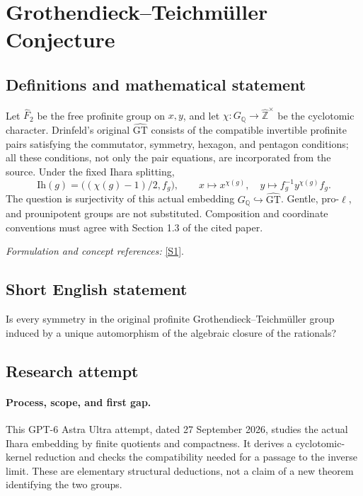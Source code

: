 \documentclass[11pt]{article}
\begin{document}
\section*{\texorpdfstring{Grothendieck–Teichmüller Conjecture}{Grothendieck–Teichmüller Conjecture}}\label{91}
\subsection{Definitions and mathematical statement}
Let $\widehat F_2$ be the free profinite group on $x,y$, and let $\chi:G_{{\mathbb{Q}}}\to\widehat{{\mathbb{Z}}}^\times$ be the cyclotomic character. Drinfeld's original $\widehat{\mathrm{GT}}$ consists of the compatible invertible profinite pairs satisfying the commutator, symmetry, hexagon, and pentagon conditions; all these conditions, not only the pair equations, are incorporated from the source. Under the fixed Ihara splitting,
\[
 \mathrm{Ih}(g)=\bigl((\chi(g)-1)/2,f_g\bigr),\qquad
 x\mapsto x^{\chi(g)},\quad y\mapsto f_g^{-1}y^{\chi(g)}f_g.
\]
The question is surjectivity of this actual embedding $G_{{\mathbb{Q}}}\hookrightarrow\widehat{\mathrm{GT}}$. Gentle, pro-$\ell$, and prounipotent groups are not substituted. Composition and coordinate conventions must agree with Section 1.3 of the cited paper.
\par\smallskip\textit{Formulation and concept references:} \href{https://arxiv.org/pdf/2405.11725v3}{[S1]}.

\subsection{Short English statement}
Is every symmetry in the original profinite Grothendieck--Teichmüller group induced by a unique automorphism of the algebraic closure of the rationals?
\subsection{Research attempt}
\paragraph{Process, scope, and first gap.}
This GPT-6 Astra Ultra attempt, dated 27 September 2026, studies the actual Ihara embedding by finite quotients and compactness. It derives a cyclotomic-kernel reduction and checks the compatibility needed for a passage to the inverse limit. These are elementary structural deductions, not a claim of a new theorem identifying the two groups.
\end{document}
